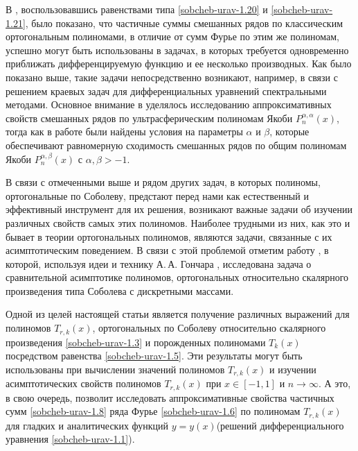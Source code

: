  В \cite{sobcheb_urav-Shar11,sobcheb_urav-Shar12,sobcheb_urav-Shar13,sobcheb_urav-Shar14,sobcheb_urav-Shar15,
sobcheb_urav-Shar16,sobcheb_urav-Shar17,sobcheb_urav-Shar18}, воспользовавшись равенствами типа \eqref{sobcheb-urav-1.20} и \eqref{sobcheb-urav-1.21}, было показано, что частичные суммы смешанных рядов по классическим ортогональным полиномами, в отличие от сумм Фурье по этим же полиномам, успешно могут быть использованы в задачах, в которых требуется одновременно приближать дифференцируемую функцию и ее несколько производных. Как было показано выше, такие задачи непосредственно возникают, например, в связи с решением краевых задач для дифференциальных уравнений спектральными методами.  Основное внимание  в \cite{sobcheb_urav-Shar11,sobcheb_urav-Shar12,sobcheb_urav-Shar13,sobcheb_urav-Shar14,sobcheb_urav-Shar15,
sobcheb_urav-Shar16}  уделялось исследованию аппроксимативных свойств смешанных рядов по ультрасферическим полиномам Якоби  $P_n^{\alpha,\alpha}(x)$, тогда как в работе \cite{sobcheb_urav-Shar18} были найдены условия на параметры $\alpha$ и $\beta$, которые обеспечивают равномерную сходимость смешанных рядов по общим полиномам Якоби $P_n^{\alpha,\beta}(x)$ с $\alpha,\beta>-1$.

   В связи с отмеченными выше и рядом других  задач, в которых полиномы, ортогональные по Соболеву, предстают перед нами как естественный и эффективный инструмент для их решения, возникают важные задачи об изучении различных  свойств самых этих полиномов. Наиболее трудными из них, как это и бывает в теории ортогональных полиномов, являются задачи, связанные с их асимптотическим поведением.   В связи с этой проблемой  отметим  работу
\cite{sobcheb_urav-Lopez1995}, в которой, используя  идеи и технику А.\,А. Гончара \cite{sobcheb_urav-Gonchar1975}, исследована задача о сравнительной асимптотике полиномов, ортогональных относительно скалярного произведения типа  Соболева с дискретными массами.

Одной из целей настоящей статьи является получение различных выражений для полиномов $T_{r,k}(x)$, ортогональных по Соболеву относительно скалярного произведения \eqref{sobcheb-urav-1.3} и порожденных полиномами  $T_{k}(x)$ посредством  равенства \eqref{sobcheb-urav-1.5}. Эти результаты могут быть использованы при вычислении значений полиномов  $T_{r,k}(x)$ и изучении асимптотических свойств полиномов $T_{r,k}(x)$ при $x\in[-1,1]$ и $n\to\infty$. А это, в свою очередь, позволит исследовать аппроксимативные свойства частичных сумм \eqref{sobcheb-urav-1.8} ряда Фурье \eqref{sobcheb-urav-1.6} по полиномам $T_{r,k}(x)$ для гладких и аналитических функций $y=y(x) $(решений дифференциального уравнения \eqref{sobcheb-urav-1.1}).

